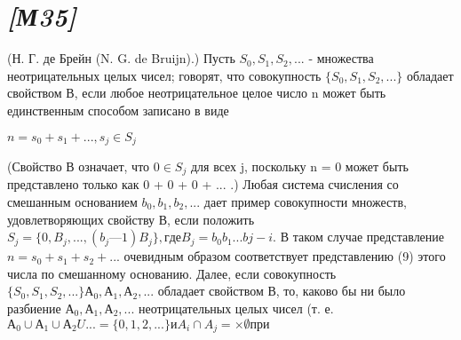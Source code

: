\section{\textit{[М35]}}
(Н. Г. де Брейн (N. G. de Bruijn).) Пусть $S_{0}, S_{1}, S_{2}, ...$ - множества неотрицательных целых чисел; говорят, что совокупность $\lbrace S_{0}, S_{1}, S_{2}, ...\rbrace$ обладает свойством В, если любое неотрицательное целое число n может быть единственным способом записано в виде
\begin{center}
$n = s_{0} + s_{1} + ...,	s_{j} \in S_{j}$
\end{center}
(Свойство В означает, что $0 \in S_{j}$ для всех j, поскольку n = 0 может быть представлено только как 0 + 0 + 0 + ... .) Любая система счисления со смешанным основанием $b_{0}, b_{1}, b_{2},...$ дает пример совокупности множеств, удовлетворяющих свойству В, если положить $S_{j} = \lbrace 0, B_{j},..., (b_{j} — 1)B_{j} \rbrace, где B_{j} = b_{0}b_{1} ...b{j-i}.$ В таком случае представление $n = s_{0} + s_{1} + s_{2} + ... $ очевидным образом соответствует представлению (9) этого числа по смешанному основанию. Далее, если совокупность $\lbrace S_{0}, S_{1}, S_{2},...\rbrace А_{0}, А_{1}, А_{2}, ...$ обладает
свойством В, то, каково бы ни было разбиение $А_{0}, А_{1}, А_{2}, ...$ неотрицательных целых чисел (т. е. $А_{0} \cup А_{1} \cup А_{2} U ... = \lbrace 0,1, 2,...\rbrace и A_{i} \cap A_{j} = \times\emptyset при$

